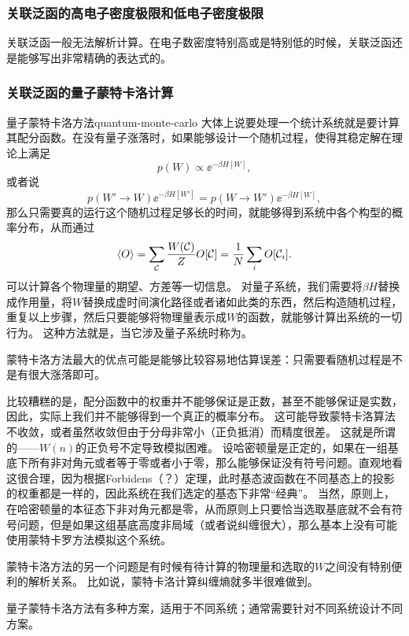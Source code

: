 \subsubsection{关联泛函的高电子密度极限和低电子密度极限}

关联泛函一般无法解析计算。在电子数密度特别高或是特别低的时候，关联泛函还是能够写出非常精确的表达式的。

\subsubsection{关联泛函的量子蒙特卡洛计算}

\begin{back}{量子蒙特卡洛方法}{quantum-monte-carlo}
    大体上说要处理一个统计系统就是要计算其配分函数。在没有量子涨落时，如果能够设计一个随机过程，使得其稳定解在理论上满足
    \[
        p(W) \propto \ee^{- \beta H[W]},
    \]
    或者说
    \[
        p(W' \to W) \ee^{-\beta H[W']} = p(W \to W') \ee^{- \beta H[W]},
    \]
    那么只需要真的运行这个随机过程足够长的时间，就能够得到系统中各个构型的概率分布，从而通过
    \begin{equation}
        \expval{O} = \sum_{\mathcal{C}} \frac{W(\mathcal{C})}{Z} O[\mathcal{C}] = \frac{1}{N} \sum_i O[\mathcal{C}_i].
        \label{eq:classical-expectation}
    \end{equation}
    可以计算各个物理量的期望、方差等一切信息。
    对量子系统，我们需要将$\beta H$替换成作用量，将$W$替换成虚时间演化路径或者诸如此类的东西，然后构造随机过程，重复以上步骤，然后只要能够将物理量表示成$W$的函数，就能够计算出系统的一切行为。
    这种方法就是，当它涉及量子系统时称为。

    蒙特卡洛方法最大的优点可能是能够比较容易地估算误差：只需要看随机过程是不是有很大涨落即可。

    比较糟糕的是，配分函数中的权重并不能够保证是正数，甚至不能够保证是实数，因此，实际上我们并不能够得到一个真正的概率分布。
    这可能导致蒙特卡洛算法不收敛，或者虽然收敛但由于分母非常小（正负抵消）而精度很差。
    这就是所谓的——$W(n)$的正负号不定导致模拟困难。
    设哈密顿量是正定的，如果在一组基底下所有非对角元或者等于零或者小于零，那么能够保证没有符号问题。直观地看这很合理，因为根据Forbidens（？）定理，此时基态波函数在不同基态上的投影的权重都是一样的，因此系统在我们选定的基态下非常“经典”。
    当然，原则上，在哈密顿量的本征态下非对角元都是零，从而原则上只要恰当选取基底就不会有符号问题，但是如果这组基底高度非局域（或者说纠缠很大），那么基本上没有可能使用蒙特卡罗方法模拟这个系统。

    蒙特卡洛方法的另一个问题是有时候有待计算的物理量和选取的$W$之间没有特别便利的解析关系。
    比如说，蒙特卡洛计算纠缠熵就多半很难做到。

    量子蒙特卡洛方法有多种方案，适用于不同系统；通常需要针对不同系统设计不同方案。
\end{back}

